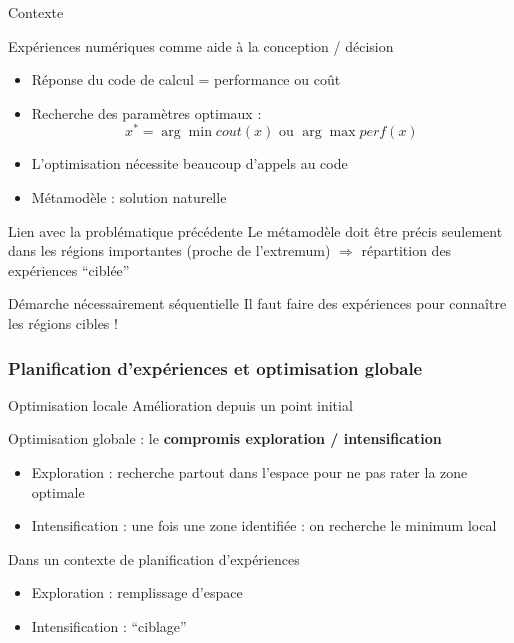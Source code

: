 \documentclass{beamer}
\begin{document}
\begin{frame}{Contexte}
\begin{block}{Expériences numériques comme aide à la conception / décision}
 \begin{itemize}
  \item Réponse du code de calcul = performance ou coût
  \item Recherche des paramètres optimaux :
  $$x^* = \arg \min cout(x) \text{ ou } \arg \max {perf(x)}$$
  \item L'optimisation nécessite beaucoup d'appels au code
  \item Métamodèle : solution naturelle
 \end{itemize}
\end{block}

\begin{exampleblock}{Lien avec la problématique précédente}
Le métamodèle doit être précis seulement dans les régions importantes (proche de l'extremum)
$\Rightarrow$ répartition des expériences ``ciblée''
\end{exampleblock}

\begin{alertblock}{Démarche nécessairement séquentielle}
Il faut faire des expériences pour connaître les régions cibles !
\end{alertblock}
\end{frame}
\begin{frame}
  \frametitle{Planification d'expériences et optimisation globale}
  \begin{block}{Optimisation locale}
Amélioration depuis un point initial
  \end{block}

  \begin{block}{Optimisation globale : le \textbf{compromis exploration / intensification}}
  \begin{itemize}
   \item Exploration : recherche partout dans l'espace pour ne pas rater la zone optimale 
   \item Intensification : une fois une zone identifiée : on recherche le minimum local
  \end{itemize}
  \end{block}
  
\begin{exampleblock}{Dans un contexte de planification d'expériences}
  \begin{itemize}
   \item Exploration : remplissage d'espace
   \item Intensification : ``ciblage''
  \end{itemize}
\end{exampleblock}
  
\end{frame}
\end{document}

